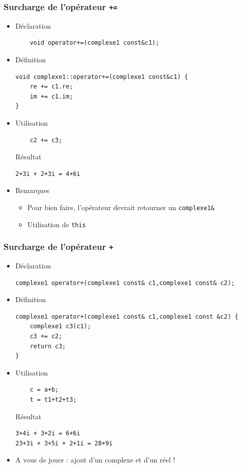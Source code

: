 \begin{frame}[fragile]\frametitle{Surcharge de l'opérateur \texttt{+=}}
\begin{itemize}
\item Déclaration
\begin{lstlisting}
    void operator+=(complexe1 const&c1);
\end{lstlisting}
\item Définition
\begin{lstlisting}
void complexe1::operator+=(complexe1 const&c1) {
    re += c1.re;
    im += c1.im;
}
\end{lstlisting}
\item Utilisation
\begin{lstlisting}
    c2 += c3;
\end{lstlisting}
\begin{block}{Résultat}
{\tiny
\begin{verbatim}
2+3i + 2+3i = 4+6i
\end{verbatim}
}
\end{block}
\item Remarques
\begin{itemize}
\item Pour bien faire, l'opérateur devrait retourner un \texttt{complexe1\&}
\item Utilisation de \texttt{this}
\end{itemize}
\end{itemize}
\end{frame}

\begin{frame}[fragile]\frametitle{Surcharge de l'opérateur \texttt{+}}
\begin{itemize}
\item Déclaration
\begin{lstlisting}
complexe1 operator+(complexe1 const& c1,complexe1 const& c2);
\end{lstlisting}
\item Définition
\begin{lstlisting}
complexe1 operator+(complexe1 const& c1,complexe1 const &c2) {
    complexe1 c3(c1);
    c3 += c2;
    return c3;
}
\end{lstlisting}
\item Utilisation
\begin{lstlisting}
    c = a+b;
    t = t1+t2+t3;
\end{lstlisting}
\begin{block}{Résultat}
{\tiny
\begin{verbatim}
3+4i + 3+2i = 6+6i
23+3i + 3+5i + 2+1i = 28+9i
\end{verbatim}
}
\end{block}
\item A vous de jouer : ajout d'un complexe et d'un réel !
\end{itemize}
\end{frame}

